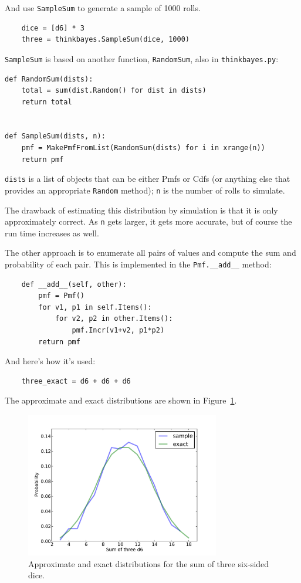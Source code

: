 \documentclass[12pt]{book}
\begin{document}
And use \verb"SampleSum" to generate a sample of 1000 rolls.

\begin{verbatim}
    dice = [d6] * 3
    three = thinkbayes.SampleSum(dice, 1000)
\end{verbatim}

\verb"SampleSum" is based on another function, \verb"RandomSum",
also in \verb"thinkbayes.py":

\begin{verbatim}
def RandomSum(dists):
    total = sum(dist.Random() for dist in dists)
    return total


def SampleSum(dists, n):
    pmf = MakePmfFromList(RandomSum(dists) for i in xrange(n))
    return pmf
\end{verbatim}

\verb"dists" is a list of objects that can be either
Pmfs or Cdfs (or anything else that provides an appropriate
\verb"Random" method); \verb"n" is the number of rolls to simulate.

The drawback of estimating this distribution by simulation is that
it is only approximately correct.  As \verb"n" gets larger, it gets
more accurate, but of course the run time increases as well.

The other approach is to enumerate all pairs of values and
compute the sum and probability of each pair.  This is implemented
in the \verb"Pmf.__add__" method:

\begin{verbatim}
    def __add__(self, other):
        pmf = Pmf()
        for v1, p1 in self.Items():
            for v2, p2 in other.Items():
                pmf.Incr(v1+v2, p1*p2)
        return pmf
\end{verbatim}

And here's how it's used:

\begin{verbatim}
    three_exact = d6 + d6 + d6
\end{verbatim}

The approximate and exact distributions are shown in
Figure~\ref{fig.dungeons1}.

\begin{figure}
\centerline{\includegraphics[height=2.5in]{figs/dungeons1.pdf}}
\caption{Approximate and exact distributions for the sum of
three six-sided dice.}
\label{fig.dungeons1}
\end{figure}
\end{document}
